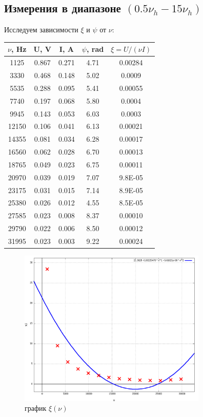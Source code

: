 \documentclass{article}
\begin{document}
\subsection{Измерения в диапазоне \((0.5\nu_h - 15\nu_h)\)}
Исследуем зависимости \(\xi\) и \(\psi\) от \(\nu\):
\begin{table}[H]
    \centering
    \begin{tabular}{|c|c|c|c|c|}
    \hline
    \(\nu\), Hz & U, V  & I, A  & \(\psi\), rad & \(\xi = U/(\nu I)\) \\\hline
    1125  & 0.867 & 0.271 & 4.71 & 0.00284 \\\hline
    3330  & 0.468 & 0.148 & 5.02 & 0.0009  \\\hline
    5535  & 0.288 & 0.095 & 5.41 & 0.00055 \\\hline
    7740  & 0.197 & 0.068 & 5.80 & 0.0004  \\\hline
    9945  & 0.143 & 0.053 & 6.03 & 0.0003  \\\hline
    12150 & 0.106 & 0.041 & 6.13 & 0.00021 \\\hline
    14355 & 0.081 & 0.034 & 6.28 & 0.00017 \\\hline
    16560 & 0.062 & 0.028 & 6.70 & 0.00013 \\\hline
    18765 & 0.049 & 0.023 & 6.75 & 0.00011 \\\hline
    20970 & 0.039 & 0.019 & 7.07 & 9.8E-05 \\\hline
    23175 & 0.031 & 0.015 & 7.14 & 8.9E-05 \\\hline
    25380 & 0.026 & 0.012 & 4.55 & 8.5E-05 \\\hline
    27585 & 0.023 & 0.008 & 8.37 & 0.00010 \\\hline
    29790 & 0.022 & 0.006 & 8.50 & 0.00012 \\\hline
    31995 & 0.023 & 0.003 & 9.22 & 0.00024 \\\hline
    \end{tabular}
\end{table}

\begin{figure}[H]
    \centering
    \includegraphics[width=0.8\textwidth]{4.png}
    \caption{график \( \xi(\nu) \)}
\end{figure}
\end{document}

